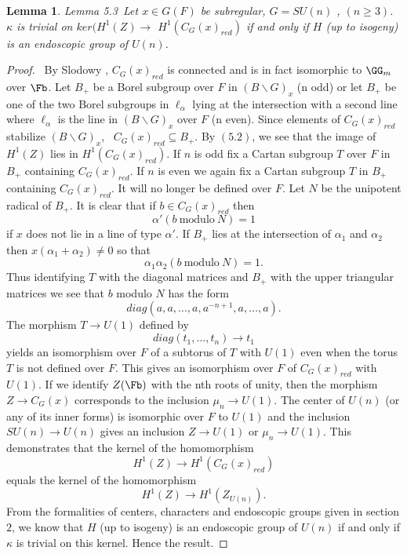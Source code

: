 \documentclass{memo-l}
\newtheorem{lemma}[theorem]{Lemma}
\theoremstyle{definition}
\theoremstyle{remark}
\numberwithin{section}{chapter}
\numberwithin{equation}{chapter}
\begin{document}
{\medskip}

\begin{lemma}{Lemma 5.3}\ Let $x  \in  G(F)$ be subregular, $G = SU(n)$ ,
$(n \ge 3)$.
${\kappa}$ is trivial on $ker(H^{1}(Z) {\to}$
$H^{1}(C_{G}(x)_{red})$
if and only if $H$ (up to isogeny) is an endoscopic
group of $U(n)$.
\end{lemma}


\begin{proof} \ By Slodowy \cite{MR584445}, $C_{G}(x)_{red}$ is connected and
is in fact
isomorphic to ${\GG} _{m}$ over $\Fb$.
Let $B_{+}$ be a Borel subgroup over $F$ in $(B\backslash
G)_{x}$ (n odd) or let $B_{+}$ be one of the two Borel subgroups in
${\ell}_{{\alpha}}$ lying at the intersection with a second line where
${\ell}_{{\alpha}}$ is the line in $(B\backslash G)_{x}$ over $F$ (n even).
Since elements of $C_{G}(x)_{red}$ stabilize $(B\backslash G)_{x}$,
\ $C_{G}(x)_{red} {\subseteq} B_{+}$.
By $(5.2)$, we see that the image of $H^{1}(Z)$ lies in
$H^{1}(C_{G}(x)_{red})$.  If $n$ is odd fix a Cartan subgroup $T$ over $F$
in $B_{+}$ containing $C_{G}(x)_{red}$.  If $n$ is even
we again fix a Cartan subgroup $T$ in $B_+$ containing $C_G(x)_{red}$.
It will no longer be defined over $F$.
Let $N$ be the unipotent radical of $B_{+}$.  It is clear that if $b  \in
C_{G}(x)_{red}$ then
$$
{\alpha'}(b\ {\text{modulo}}\ N)  =  1
$$
if $x$ does not lie in a line of type ${\alpha'}$.  If $B_{+}$ lies at the
intersection of ${\alpha}_{1}$ and ${\alpha}_{2}$ then
$x({\alpha}_{1}+{\alpha}_{2})  \ne 0$ so that
$$
{\alpha}_{1}{\alpha}_{2}(b\ {\text{modulo}}\ N)  =  1.
$$
Thus identifying $T$ with the diagonal matrices and $B_{+}$ with the upper
triangular matrices we see that $b$ modulo $N$ has the form
$$
diag(a,a,\ldots ,a,a^{-n+1},a,\ldots ,a).
$$
The morphism $T {\to} U(1)$ defined by
$$
diag(t_{1},\ldots ,t_{n}) {\to} t_{1}
$$
yields an isomorphism over $F$ of a subtorus of $T$ with $U(1)$ even when
the torus $T$ is not defined over $F$.  This gives an isomorphism over $F$
of $C_{G}(x)_{red}$ with $U(1)$.  If we identify $Z(\Fb )$ with the
nth roots of unity, then the morphism $Z {\to} C_{G}(x)$ corresponds to
the inclusion ${\mu}_{n} {\to} U(1)$.  The center of $U(n)$ (or any of its
inner forms) is isomorphic over $F$ to $U(1)$ and the inclusion $SU(n)
{\to} U(n)$ gives an inclusion $Z {\to} U(1)$ or ${\mu}_{n} {\to} U(1)$.
This demonstrates that the kernel of the homomorphism
$$
H^{1}(Z) {\to} H^{1}(C_{G}(x)_{red})
$$
equals the kernel of the homomorphism
$$
H^{1}(Z) {\to} H^{1}(Z_{U(n)}).
$$
From the formalities of centers, characters and endoscopic groups given in
section $2$, we know that $H$ (up to isogeny) is an
endoscopic group of $U(n)$ if and only if ${\kappa}$ is trivial on this
kernel.  Hence the result.
\end{proof}
\end{document}
